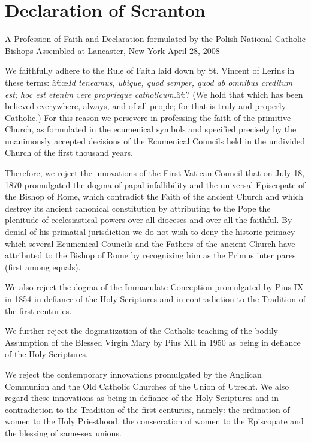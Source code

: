 \label{main}
\section{Declaration of Scranton}\label{declaration-of-scranton}

A Profession of Faith and Declaration formulated by the Polish National
Catholic Bishops Assembled at Lancaster, New York April 28, 2008

We faithfully adhere to the Rule of Faith laid down by St. Vincent of
Lerins in these terms: â€œ\emph{Id teneamus, ubique, quod semper, quod
ab omnibus creditum est; hoc est etenim vere proprieque catholicum.}â€?
(We hold that which has been believed everywhere, always, and of all
people; for that is truly and properly Catholic.) For this reason we
persevere in professing the faith of the primitive Church, as formulated
in the ecumenical symbols and specified precisely by the unanimously
accepted decisions of the Ecumenical Councils held in the undivided
Church of the first thousand years.

Therefore, we reject the innovations of the First Vatican Council that
on July 18, 1870 promulgated the dogma of papal infallibility and the
universal Episcopate of the Bishop of Rome, which contradict the Faith
of the ancient Church and which destroy its ancient canonical
constitution by attributing to the Pope the plenitude of ecclesiastical
powers over all dioceses and over all the faithful. By denial of his
primatial jurisdiction we do not wish to deny the historic primacy which
several Ecumenical Councils and the Fathers of the ancient Church have
attributed to the Bishop of Rome by recognizing him as the Primus inter
pares (first among equals).

We also reject the dogma of the Immaculate Conception promulgated by
Pius IX in 1854 in defiance of the Holy Scriptures and in contradiction
to the Tradition of the first centuries.

We further reject the dogmatization of the Catholic teaching of the
bodily Assumption of the Blessed Virgin Mary by Pius XII in 1950 as
being in defiance of the Holy Scriptures.

We reject the contemporary innovations promulgated by the Anglican
Communion and the Old Catholic Churches of the Union of Utrecht. We also
regard these innovations as being in defiance of the Holy Scriptures and
in contradiction to the Tradition of the first centuries, namely: the
ordination of women to the Holy Priesthood, the consecration of women to
the Episcopate and the blessing of same-sex unions.

